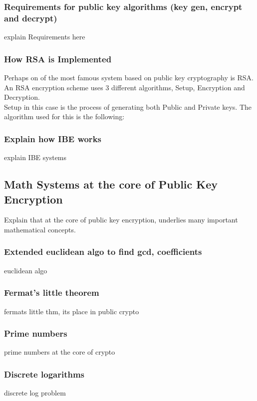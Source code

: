 \documentclass[conference]{IEEEtran}
\begin{document}
\subsubsection{Requirements for public key algorithms (key gen, encrypt and decrypt)}
explain Requirements here

\subsubsection{How RSA is Implemented}
Perhaps on of the most famous system based on public key cryptography is RSA.
An RSA encryption scheme uses 3 different algorithms, Setup, Encryption and Decryption. \\
Setup in this case is the process of generating both Public and Private keys.
The algorithm used for this is the following:



\subsubsection{Explain how IBE works}
explain IBE systems

\subsection{Math Systems at the core of Public Key Encryption}
Explain that at the core of public key encryption, underlies
many important mathematical concepts.

\subsubsection{Extended euclidean algo to find gcd, coefficients}
euclidean algo

\subsubsection{Fermat's little theorem}
fermats little thm, its place in public crypto

\subsubsection{Prime numbers}
prime numbers at the core of crypto

\subsubsection{Discrete logarithms}
discrete log problem
\end{document}
